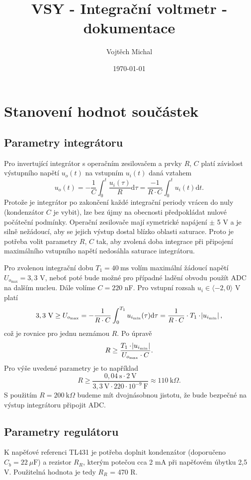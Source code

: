 \documentclass[twoside]{article}
\title{VSY - Integrační voltmetr - dokumentace}
\author{Vojtěch Michal}
\date{\today}
\begin{document}
\maketitle

\section{Stanovení hodnot součástek}

\subsection{Parametry integrátoru}

Pro invertující integrátor s operačním zesilovačem a prvky $R$, $C$ platí závislost výstupního napětí 
$u_o(t)$ na vstupním $u_i(t)$ daná vztahem
\begin{equation}
    u_o(t) = - \frac{1}{C} \int_0^t \frac{u_i(\tau)}{R} \text{d}\tau = \frac{-1}{R\cdot C} \int_0^t u_i(t) \text{d}t.
\end{equation}
Protože je integrátor po zakončení každé integrační periody vrácen do nuly (kondenzátor $C$ je vybit), lze
bez újmy na obecnosti předpokládat nulové počáteční podmínky. Operační zesilovače mají symetrické napájení $\pm$ 5 V 
a je silně nežádoucí, aby se jejich výstup dostal blízko oblasti saturace. Proto je potřeba volit parametry $R$, $C$ tak,
aby zvolená doba integrace při připojení maximálního vstupního napětí nedosáhla saturace integrátoru.

Pro zvolenou integrační dobu $T_1 = 40~\text{ms}$ volím maximální žádoucí napětí $U_{o_\text{max}} = 3,3$ V, neboť poté bude možné 
pro případné ladění obvodu použít ADC na dalším nucleu. Dále volíme $C = 220$ nF. Pro vstupní rozsah $u_i \in \langle -2, 0 \rangle$ V platí
\begin{equation}
    3,3~\text{V} \ge U_{o_\text{max}} = - \frac{1}{R \cdot C} \int_0^{T_1} u_{i_\text{min}}(\tau) \text{d} \tau = \frac{1}{R \cdot C} \cdot T_1 \cdot \abs{u_{i_\text{min}}},
\end{equation}
což je rovnice pro jednu neznámou $R$. Po úpravě
\begin{equation}
    R \ge \frac{T_1 \cdot \abs{u_{i_\text{min}}}}{U_{o_\text{max}} \cdot C}.
\end{equation}
Pro výše uvedené parametry je to například
\begin{equation}
    R \ge \frac{0,04~\text{s} \cdot 2~\text{V}}{3,3~\text{V} \cdot 220 \cdot 10^{-9}~\text{F}} \approx 110~\text{k}\Omega.
\end{equation}
S použitím $R = 200~\text{k}\Omega$ budeme mít dvojnásobnou jistotu, že bude bezpečné na výstup integrátoru připojit ADC.

\subsection{Parametry regulátoru}

K napěťové referenci TL431 je potřeba doplnit kondenzátor (doporučeno $C_b = 22~\mu \text{F}$) a rezistor $R_R$, kterým
potečou cca 2 mA při napěťovém úbytku 2,5 V. Použitelná hodnota je tedy $R_R$ = 470 R.
\end{document}
